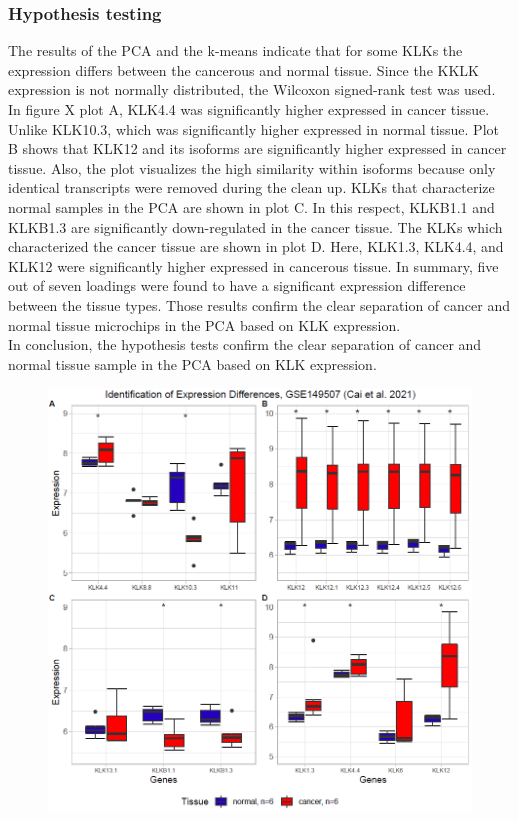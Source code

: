 \documentclass[
]{article}
\begin{document}
\hypertarget{hypothesis-testing-1}{%
\subsubsection{Hypothesis testing}\label{hypothesis-testing-1}}

The results of the PCA and the k-means indicate that for some KLKs the
expression differs between the cancerous and normal tissue. Since the
KKLK expression is not normally distributed, the Wilcoxon signed-rank
test was used. In figure X plot A, KLK4.4 was significantly higher
expressed in cancer tissue. Unlike KLK10.3, which was significantly
higher expressed in normal tissue. Plot B shows that KLK12 and its
isoforms are significantly higher expressed in cancer tissue. Also, the
plot visualizes the high similarity within isoforms because only
identical transcripts were removed during the clean up. KLKs that
characterize normal samples in the PCA are shown in plot C. In this
respect, KLKB1.1 and KLKB1.3 are significantly down-regulated in the
cancer tissue. The KLKs which characterized the cancer tissue are shown
in plot D. Here, KLK1.3, KLK4.4, and KLK12 were significantly higher
expressed in cancerous tissue. In summary, five out of seven loadings
were found to have a significant expression difference between the
tissue types. Those results confirm the clear separation of cancer and
normal tissue microchips in the PCA based on KLK expression.\\
In conclusion, the hypothesis tests confirm the clear separation of
cancer and normal tissue sample in the PCA based on KLK expression.

\begin{figure}

{\centering \includegraphics[width=0.5\linewidth]{images/Expr_diff_kmeans_PCA_lung} 

}

\end{figure}
\end{document}
